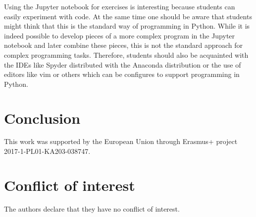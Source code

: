 \documentclass[twocolumn]{svjour3}          %
\begin{document}
Using the Jupyter notebook for exercises is interesting because
students can easily experiment with code. At the same time one should
be aware that students might think that this is the standard way of
programming in Python. While it is indeed possible to develop pieces
of a more complex program in the Jupyter notebook and later combine
these pieces, this is not the standard approach for complex
programming tasks. Therefore, students should also be acquainted with
the IDEs like Spyder distributed with the Anaconda distribution or the
use of editors like vim or others which can be configures to support
programming in Python.


\section{Conclusion}





\begin{acknowledgements}
This work was supported by the European Union through Erasmus+ project
2017-1-PL01-KA203-038747.
\end{acknowledgements}

\section*{Conflict of interest}
The authors declare that they have no conflict of interest.


\end{document}
